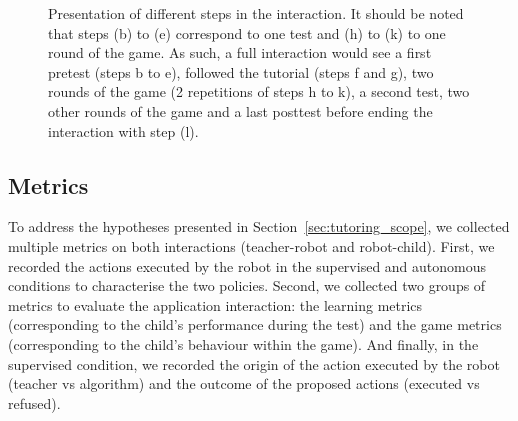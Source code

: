 \begin{figure}[ht]
	\caption{Presentation of different steps in the interaction. It should be noted that steps (b) to (e) correspond to one test and (h) to (k) to one round of the game. As such, a full interaction would see a first pretest (steps b to e), followed the tutorial (steps f and g), two rounds of the game (2 repetitions of steps h to k), a second test, two other rounds of the game and a last posttest before ending the interaction with step (l).}
	\label{fig:tuto_sequence}
\end{figure}


\subsection{Metrics} \label{sec:tuto_metric}


To address the hypotheses presented in Section~\ref{sec:tutoring_scope}, we collected multiple metrics on both interactions (teacher-robot and robot-child). First, we recorded the actions executed by the robot in the supervised and autonomous conditions to characterise the two policies. Second, we collected two groups of metrics to evaluate the application interaction: the learning metrics (corresponding to the child's performance during the test) and the game metrics (corresponding to the child's behaviour within the game). And finally, in the supervised condition, we recorded the origin of the action executed by the robot (teacher vs algorithm) and the outcome of the proposed actions (executed vs refused).

